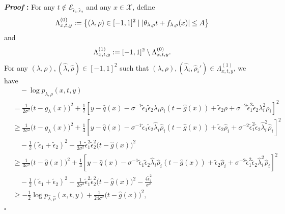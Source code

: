 \documentclass{article}
\def\eps{{\epsilon}}
\def\gE{{\mathcal{E}}}
\def\gX{{\mathcal{X}}}
\renewenvironment{proof}{\noindent\textbf{\textit{Proof }:}}{\hfill$\square$}
\begin{document}
\begin{proof}
    For any $t\notin\gE_{\tilde{\eps}_1,\tilde{\eps}_2}$ and any $x\in\gX$, define
    \begin{equation}
        \notag
        \Lambda_{x,t,y}^{(0)} := \left\{ (\lambda,\rho)\in[-1,1]^2 \mid \left|\theta_{\lambda,\rho}t+f_{\lambda,\rho}(x)\right| \leq A \right\}
    \end{equation}
    and
    \begin{equation}
        \notag
        \Lambda_{x,t,y}^{(1)} := [-1,1]^2 \setminus \Lambda_{x,t,y}^{(0)}.
    \end{equation}
    For any $(\lambda,\rho), (\hat{\lambda},\hat{\rho}) \in[-1,1]^2$ such that $(\lambda,\rho), (\hat{\lambda}_i,\hat{\rho}_i') \in \Lambda_{x,t,y}^{(1)}$, we have
    \begin{subequations}
        \label{eq:bad-density-bound}
        \begin{align}
            &\quad -\log p_{\lambda,\rho}(x,t,y)\\
            &=  \frac{1}{2\sigma^2}\big(t-g_{\lambda}(x)\big)^2 + \frac{1}{2}\left[y-\hat{q}(x)-\sigma^{-1}\tilde{\eps}_1\tilde{\eps}_2\lambda_i\rho_i(t-\hat{g}(x))+\tilde{\eps}_2\rho+\sigma^{-2}\tilde{\eps}_1^2\tilde{\eps}_2\lambda_i^2\rho_i\right]^2 \label{eq:bad-density-bound-1} \\ 
            &\geq  \frac{1}{2\sigma^2}\big(t-g_{\lambda}(x)\big)^2 + \frac{1}{4}\left[y-\hat{q}(x)-\sigma^{-1}\tilde{\eps}_1\tilde{\eps}_2\hat{\lambda}_i\hat{\rho}_i(t-\hat{g}(x))+\tilde{\eps}_2\hat{\rho}_i+\sigma^{-2}\tilde{\eps}_1^2\tilde{\eps}_2\hat{\lambda}_i^2\hat{\rho}_i\right]^2 \nonumber \\
            &\quad - \frac{1}{2} (\tilde{\eps}_1+\tilde{\eps}_2)^2 - \frac{1}{2\sigma^2}\tilde{\eps}_1^2\tilde{\eps}_2^2\big(t-\hat{g}(x)\big)^2 \label{eq:bad-density-bound-2} \\
            &\geq   \frac{1}{3\sigma^2}\big(t-\hat{g}(x)\big)^2 + \frac{1}{4}\left[y-\hat{q}(x)-\sigma^{-1}\tilde{\eps}_1\tilde{\eps}_2\hat{\lambda}_i\hat{\rho}_i(t-\hat{g}(x))+\tilde{\eps}_2\hat{\rho}_i+\sigma^{-2}\tilde{\eps}_1^2\tilde{\eps}_2\hat{\lambda}_i^2\hat{\rho}_i\right]^2 \nonumber \\
            &\quad - \frac{1}{2} (\tilde{\eps}_1+\tilde{\eps}_2)^2 - \frac{1}{2\sigma^2}\tilde{\eps}_1^2\tilde{\eps}_2^2\big(t-\hat{g}(x)\big)^2 -\frac{4\tilde{\eps}_1^2}{\sigma^2} \label{eq:bad-density-bound-3} \\
            &\geq -\frac{1}{2}\log p_{\hat{\lambda},\hat{\rho}}(x,t,y) + \frac{1}{24\sigma^2}\big(t-\hat{g}(x)\big)^2, \label{eq:bad-density-bound-4}

\end{align}
\end{subequations}
\end{proof}
\end{document}
